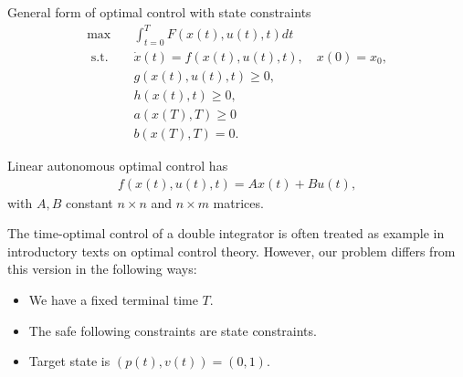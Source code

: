 \documentclass[a4paper]{article}
\theoremstyle{definition}
\theoremstyle{plain}
\begin{document}
General form of optimal control with state constraints
\begin{subequations}
\begin{align}
  \max \quad & \int_{t=0}^{T} F(x(t), u(t), t) dt \\
  \text{ s.t. } \;\, & \dot{x}(t) = f(x(t), u(t), t) , \quad x(0) = x_{0} , \\
                & g(x(t), u(t), t) \geq 0 , \\
             & h(x(t), t) \geq 0 , \\
             & a(x(T), T) \geq 0 \\
             & b(x(T), T) = 0 .
\end{align}
\end{subequations}


Linear autonomous optimal control has
\begin{align*}
  f(x(t), u(t), t) = A x(t) + B u(t),
\end{align*}
with $A, B$ constant $n\times n$ and $n \times m$ matrices.

The time-optimal control of a double integrator is often treated as example in
introductory texts on optimal control theory. However, our problem differs from
this version in the following ways:
\begin{itemize}
  \item We have a fixed terminal time $T$.
  \item The safe following constraints are state constraints.
  \item Target state is $(p(t), v(t)) = (0, 1)$.
\end{itemize}
\end{document}
